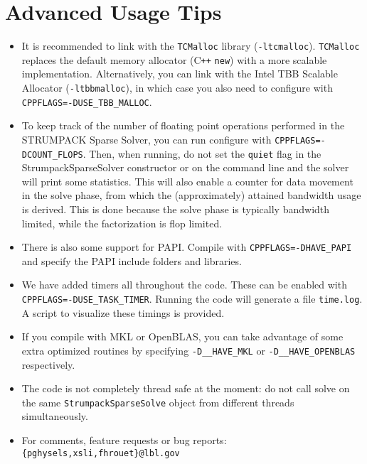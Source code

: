 \documentclass{article}
\newcommand{\tm}{\textsuperscript{\textregistered}}
\begin{document}
\section{Advanced Usage Tips}\label{sec:tips}
\begin{itemize}
\item It is recommended to link with the \texttt{TCMalloc} library
  (\lstinline[style=Bash]!-ltcmalloc!). \texttt{TCMalloc} replaces the
  default memory allocator (C\texttt{++} \texttt{new}) with a more
  scalable implementation. Alternatively, you can link with the
  Intel\tm{} TBB Scalable Allocator
  (\lstinline[style=Bash]!-ltbbmalloc!), in which case you also need
  to configure with \lstinline[style=Bash]!CPPFLAGS=-DUSE_TBB_MALLOC!.
\item To keep track of the number of floating point operations
  performed in the STRUMPACK Sparse Solver, you can run configure with
  \lstinline[style=Bash]!CPPFLAGS=-DCOUNT_FLOPS!. Then, when running,
  do not set the \texttt{quiet} flag in the StrumpackSparseSolver
  constructor or on the command line and the solver will print some
  statistics. This will also enable a counter for data movement in the
  solve phase, from which the (approximately) attained bandwidth usage
  is derived. This is done because the solve phase is typically
  bandwidth limited, while the factorization is flop limited.
\item There is also some support for PAPI. Compile with
  \lstinline[style=Bash]!CPPFLAGS=-DHAVE_PAPI! and specify the PAPI
  include folders and libraries.
\item We have added timers all throughout the code. These can be
  enabled with
  \lstinline[style=Bash]!CPPFLAGS=-DUSE_TASK_TIMER!. Running the code
  will generate a file \lstinline[style=Bash]!time.log!. A script to
  visualize these timings is provided.
\item If you compile with MKL or OpenBLAS, you can take advantage of
  some extra optimized routines by specifying
  \lstinline[style=Bash]!-D__HAVE_MKL!  or
  \lstinline[style=Bash]!-D__HAVE_OPENBLAS! respectively.
\item The code is not completely thread safe at the moment: do not
  call solve on the same \lstinline[style=C]!StrumpackSparseSolve!
  object from different threads simultaneously.
\item For comments, feature requests or bug reports:
  \texttt{\{pghysels,xsli,fhrouet\}@lbl.gov}
\end{itemize}
\end{document}
